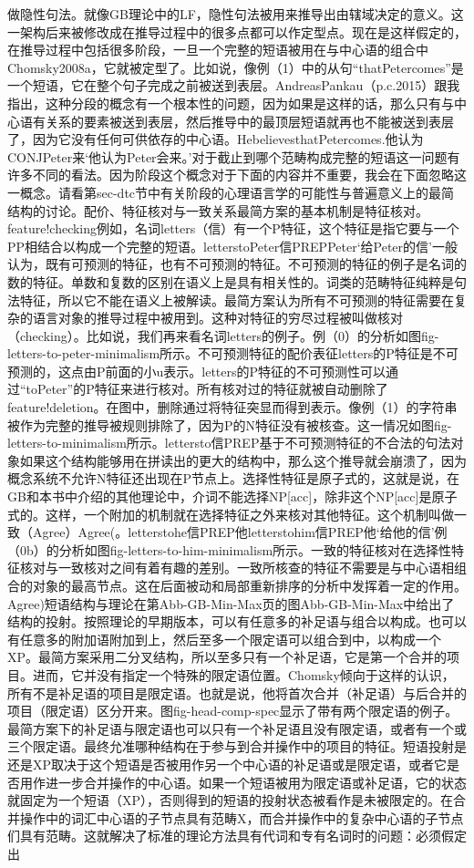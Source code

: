 做隐性句法。就像GB理论中的LF，隐性句法被用来推导出由辖域决定的意义。这一架构后来被修改成在推导过程中的很多点都可以作定型点。现在是这样假定的，在推导过程中包括很多阶段，一旦一个完整的短语被用在与中心语的组合中Chomsky2008a，它就被定型了。比如说，像例（1）中的从句“thatPetercomes”是一个短语，它在整个句子完成之前被送到表层。AndreasPankau（p.c.2015）跟我指出，这种分段的概念有一个根本性的问题，因为如果是这样的话，那么只有与中心语有关系的要素被送到表层，然后推导中的最顶层短语就再也不能被送到表层了，因为它没有任何可供依存的中心语。HebelievesthatPetercomes.他认为CONJPeter来`他认为Peter会来。'对于截止到哪个范畴构成完整的短语这一问题有许多不同的看法。因为阶段这个概念对于下面的内容并不重要，我会在下面忽略这一概念。请看第sec-dtc节中有关阶段的心理语言学的可能性与普遍意义上的最简结构的讨论。配价、特征核对与一致关系最简方案的基本机制是特征核对。feature!checking例如，名词letters（信）有一个P特征，这个特征是指它要与一个PP相结合以构成一个完整的短语。letterstoPeter信PREPPeter`给Peter的信'一般认为，既有可预测的特征，也有不可预测的特征。不可预测的特征的例子是名词的数的特征。单数和复数的区别在语义上是具有相关性的。词类的范畴特征纯粹是句法特征，所以它不能在语义上被解读。最简方案认为所有不可预测的特征需要在复杂的语言对象的推导过程中被用到。这种对特征的穷尽过程被叫做核对（checking）。比如说，我们再来看名词letters的例子。例（0）的分析如图fig-letters-to-peter-minimalism所示。不可预测特征的配价表征letters的P特征是不可预测的，这点由P前面的小u表示。letters的P特征的不可预测性可以通过“toPeter”的P特征来进行核对。所有核对过的特征就被自动删除了feature!deletion。在图中，删除通过将特征突显而得到表示。像例（1）的字符串被作为完整的推导被规则排除了，因为P的N特征没有被核查。这一情况如图fig-letters-to-minimalism所示。lettersto信PREP基于不可预测特征的不合法的句法对象如果这个结构能够用在拼读出的更大的结构中，那么这个推导就会崩溃了，因为概念系统不允许N特征还出现在P节点上。选择性特征是原子式的，这就是说，在GB和本书中介绍的其他理论中，介词不能选择NP[acc]，除非这个NP[acc]是原子式的。这样，一个附加的机制就在选择特征之外来核对其他特征。这个机制叫做一致（Agree）Agree(。letterstohe信PREP他letterstohim信PREP他`给他的信'例（0b）的分析如图fig-letters-to-him-minimalism所示。一致的特征核对在选择性特征核对与一致核对之间有着有趣的差别。一致所核查的特征不需要是与中心语相组合的对象的最高节点。这在后面被动和局部重新排序的分析中发挥着一定的作用。Agree)短语结构与理论在第Abb-GB-Min-Max页的图Abb-GB-Min-Max中给出了结构的投射。按照理论的早期版本，可以有任意多的补足语与组合以构成。也可以有任意多的附加语附加到上，然后至多一个限定语可以组合到中，以构成一个XP。最简方案采用二分叉结构，所以至多只有一个补足语，它是第一个合并的项目。进而，它并没有指定一个特殊的限定语位置。Chomsky倾向于这样的认识，所有不是补足语的项目是限定语。也就是说，他将首次合并（补足语）与后合并的项目（限定语）区分开来。图fig-head-comp-spec显示了带有两个限定语的例子。最简方案下的补足语与限定语也可以只有一个补足语且没有限定语，或者有一个或三个限定语。最终允准哪种结构在于参与到合并操作中的项目的特征。短语投射是还是XP取决于这个短语是否被用作另一个中心语的补足语或是限定语，或者它是否用作进一步合并操作的中心语。如果一个短语被用为限定语或补足语，它的状态就固定为一个短语（XP），否则得到的短语的投射状态被看作是未被限定的。在合并操作中的词汇中心语的子节点具有范畴X，而合并操作中的复杂中心语的子节点们具有范畴。这就解决了标准的理论方法具有代词和专有名词时的问题：必须假定出